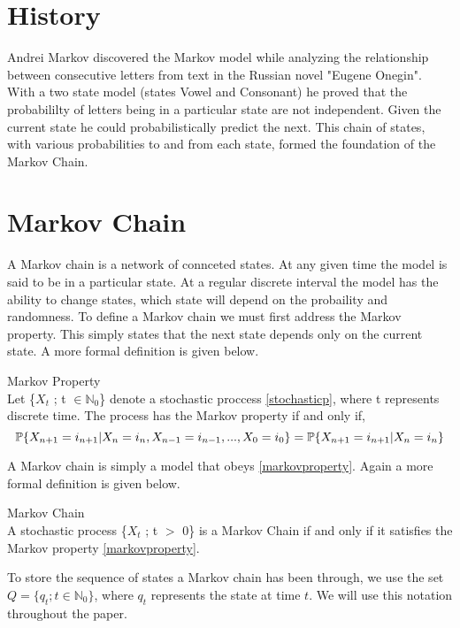 \section{History}
Andrei Markov discovered the Markov model while analyzing the relationship between consecutive letters from text in the Russian novel "Eugene Onegin". With a two state model (states Vowel and Consonant) he proved that the probabililty of letters being in a particular state are not independent. Given the current state he could probabilistically predict the next. This chain of states, with various probabilities to and from each state, formed the foundation of the Markov Chain.

\section{Markov Chain}
A Markov chain is a network of connceted states. At any given time the model is said to be in a particular state. At a regular discrete interval
the model has the ability to change states, which state will depend on the probaility and randomness. To define a Markov chain we must first address the Markov property. 
This simply states that the next state depends only on the current state. A more formal definition is given below. 

\begin{definition}
\label{markovproperty}
	Markov Property \\
	Let \{$X_t$ ; t $\in \mathbb{N}_0$\} denote a stochastic proccess \ref{stochasticp}, where t 				represents discrete time. The process has the Markov property if and only if,
	\begin{equation}
		\mathbb{P} \{X_{n+1} = i_{n+1} | X_n = i_n, X_{n-1} = i_{n-1},...,X_0 = i_0\} = \mathbb{P} \{X_{n+1} = 				i_{n+1} | X_n = i_n\}
	\end{equation}
\end{definition}


A Markov chain is simply a model that obeys \ref{markovproperty}. Again a more formal definition is given below.

\begin{definition}
\label{markovchain}
	Markov Chain \\
	A stochastic process \{$X_t$ ; t $>$ 0\} is a Markov Chain if and only if it satisfies the Markov 			property \ref{markovproperty}.
\end{definition}

To store the sequence of states a Markov chain has been through, we use the set $Q = \{q_t ; t \in \mathbb{N}_0\}$, where $q_t$ represents 
the state at time $t$. We will use this notation throughout the paper.

